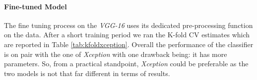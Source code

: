 \paragraph{Fine-tuned Model}
The fine tuning process on the \textit{VGG-16} uses its dedicated
pre-processing function on the data. After a short training period
we ran the K-fold CV estimates which are reported in Table \ref{tab:kfoldxception}.
Overall the performance of the classifier is on pair with the one of \textit{Xception}
with one drawback being: it has more parameters. So, from a practical standpoint,
\textit{Xception} could be preferable as the two models is not that far different in terms of results.